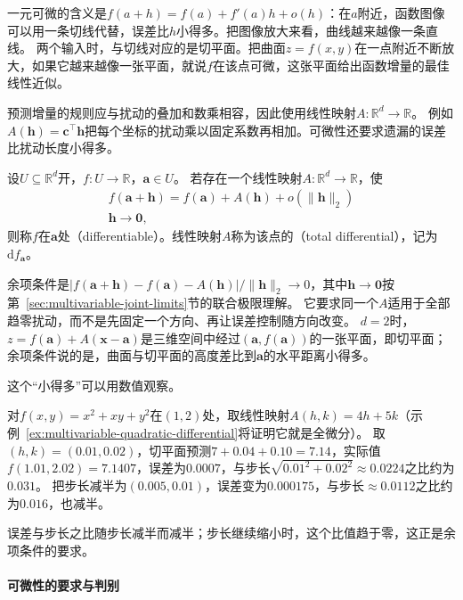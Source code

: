 一元可微的含义是$f(a+h)=f(a)+f'(a)h+o(h)$：在$a$附近，函数图像可以用一条切线代替，误差比$h$小得多。把图像放大来看，曲线越来越像一条直线。
两个输入时，与切线对应的是切平面。把曲面$z=f(x,y)$在一点附近不断放大，如果它越来越像一张平面，就说$f$在该点可微，这张平面给出函数增量的最佳线性近似。

预测增量的规则应与扰动的叠加和数乘相容，因此使用线性映射$A:\mathbb R^d\to\mathbb R$。
例如$A(\bm h)=\bm c^\top\bm h$把每个坐标的扰动乘以固定系数再相加。可微性还要求遗漏的误差比扰动长度小得多。
\begin{definition}[多元标量函数的可微性与全微分]
\label{def:multivariable-total-differential}
设$U\subseteq\mathbb R^d$开，$f:U\to\mathbb R$，$\bm a\in U$。
若存在一个线性映射$A:\mathbb R^d\to\mathbb R$，使
\begin{equation}
\begin{gathered}
f(\bm a+\bm h)=f(\bm a)+A(\bm h)+o(\lVert\bm h\rVert_2)\\
\bm h\to\bm0,
\end{gathered}
\label{eq:analysis-total-differentiability}
\end{equation}
则称$f$在$\bm a$处（differentiable）。线性映射$A$称为该点的（total differential），记为$\mathrm df_{\bm a}$。
\end{definition}
余项条件是$|f(\bm a+\bm h)-f(\bm a)-A(\bm h)|/\lVert\bm h\rVert_2\to0$，其中$\bm h\to\bm 0$按第~\ref{sec:multivariable-joint-limits}节的联合极限理解。
它要求同一个$A$适用于全部趋零扰动，而不是先固定一个方向、再让误差控制随方向改变。
$d=2$时，$z=f(\bm a)+A(\bm x-\bm a)$是三维空间中经过$(\bm a,f(\bm a))$的一张平面，即切平面；余项条件说的是，曲面与切平面的高度差比到$\bm a$的水平距离小得多。

这个“小得多”可以用数值观察。
\begin{example}[切平面误差随步长缩小]
\label{ex:multivariable-tangent-plane-error}
对$f(x,y)=x^2+xy+y^2$在$(1,2)$处，取线性映射$A(h,k)=4h+5k$（示例~\ref{ex:multivariable-quadratic-differential}将证明它就是全微分）。
取$(h,k)=(0.01,0.02)$，切平面预测$7+0.04+0.10=7.14$，实际值$f(1.01,2.02)=7.1407$，误差为$0.0007$，与步长$\sqrt{0.01^2+0.02^2}\approx0.0224$之比约为$0.031$。
把步长减半为$(0.005,0.01)$，误差变为$0.000175$，与步长$\approx0.0112$之比约为$0.016$，也减半。
\end{example}

误差与步长之比随步长减半而减半；步长继续缩小时，这个比值趋于零，这正是余项条件的要求。

\paragraph{可微性的要求与判别}
\label{sec:analysis-differentiability-relations}

